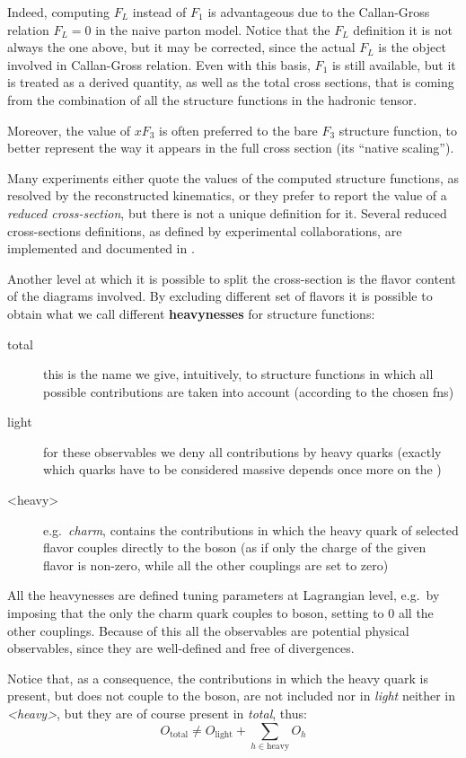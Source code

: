 Indeed, computing $F_L$ instead of $F_1$ is advantageous due to the Callan-Gross
relation \cite{Callan:1969uq} $F_L=0$ in the naive parton model.
Notice that the $F_L$ definition it is not always the one above, but it may be
corrected, since the actual $F_L$ is the object involved in Callan-Gross
relation.
%
Even with this basis, $F_1$ is still available, but it is treated as a derived
quantity, as well as the total cross sections, that is coming from the
combination of all the structure functions in the hadronic tensor.

Moreover, the value of $xF_3$ is often preferred to the bare $F_3$ structure
function, to better represent the way it appears in the full cross section (its
\enquote{native scaling}).

Many experiments either quote the values of the computed structure functions,
as resolved by the reconstructed kinematics, or they prefer to report the value
of a \textit{reduced cross-section}, but there is not a unique definition for
it.
Several reduced cross-sections definitions, as defined by experimental
collaborations, are implemented and documented in \yadism.

Another level at which it is possible to split the \dis cross-section is the
flavor content of the diagrams involved.
By excluding different set of flavors it is possible to obtain what we call
different \textbf{heavynesses} for structure functions:
\begin{description}
  \item[total] this is the name we give, intuitively, to structure functions in
    which all possible contributions are taken into account (according to the
    chosen \acrlong{fns})
  \item[light] for these observables we deny all contributions by heavy quarks
    (exactly which quarks have to be considered massive depends once more on
    the \fns)
  \item[<heavy>] e.g.\ \textit{charm}, contains the contributions in which the
    heavy quark of selected flavor couples directly to the \ew boson (as if
    only the charge of the given flavor is non-zero, while all the other
    couplings are set to zero)
\end{description}

All the heavynesses are defined tuning parameters at Lagrangian level, e.g.\ by
imposing that the only the charm quark couples to \ew boson, setting to 0 all
the other couplings.
Because of this all the observables are potential physical observables, since
they are well-defined and free of divergences.

Notice that, as a consequence, the contributions in which the heavy quark is
present, but does not couple to the \ew boson, are not included nor in
\textit{light} neither in \textit{<heavy>}, but they are of course present in
\textit{total}, thus:
\begin{equation}
  O_{\text{total}} \neq O_{\text{light}} + \sum_{h \in \text{heavy}} O_h 
\end{equation}
